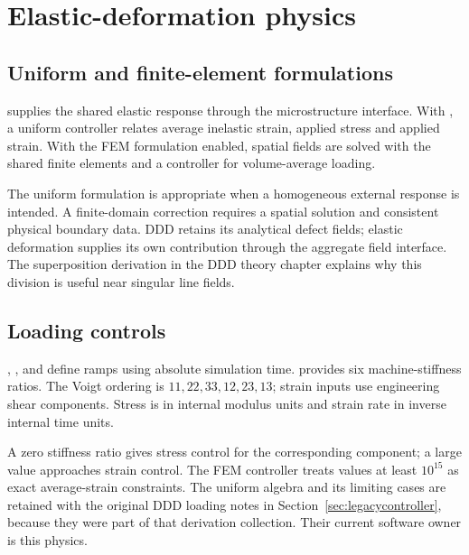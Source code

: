 \chapter{Elastic-deformation physics}\label{chap:elastic}
\section{Uniform and finite-element formulations}
 supplies the shared elastic response through the microstructure interface. With , a uniform controller relates average inelastic strain, applied stress and applied strain. With the FEM formulation enabled, spatial fields are solved with the shared finite elements and a controller for volume-average loading.

The uniform formulation is appropriate when a homogeneous external response is intended. A finite-domain correction requires a spatial solution and consistent physical boundary data. DDD retains its analytical defect fields; elastic deformation supplies its own contribution through the aggregate field interface. The superposition derivation in the DDD theory chapter explains why this division is useful near singular line fields.

\section{Loading controls}
, ,  and  define ramps using absolute simulation time.  provides six machine-stiffness ratios. The Voigt ordering is $11,22,33,12,23,13$; strain inputs use engineering shear components. Stress is in internal modulus units and strain rate in inverse internal time units.

A zero stiffness ratio gives stress control for the corresponding component; a large value approaches strain control. The FEM controller treats values at least $10^{15}$ as exact average-strain constraints. The uniform algebra and its limiting cases are retained with the original DDD loading notes in Section~\ref{sec:legacycontroller}, because they were part of that derivation collection. Their current software owner is this physics.

